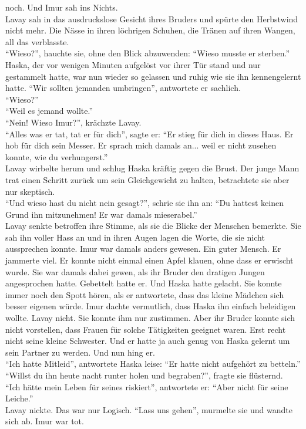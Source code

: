 noch. Und Imur sah ins Nichts.\\
Lavay sah in das ausdruckslose Gesicht ihres Bruders und spürte den Herbstwind nicht mehr. Die 
Nässe in ihren löchrigen Schuhen, die Tränen auf ihren Wangen, all das verblasste. \\
``Wieso?'', hauchte sie, ohne den Blick abzuwenden: ``Wieso musste er sterben.''\\
Haska, der vor wenigen Minuten aufgelöst vor ihrer Tür stand und nur gestammelt hatte, war nun 
wieder so gelassen und ruhig wie sie ihn kennengelernt hatte. ``Wir sollten jemanden umbringen'', 
antwortete er sachlich.\\
``Wieso?''\\
``Weil es jemand wollte.''\\
``Nein! Wieso Imur?'', krächzte Lavay.\\
``Alles was er tat, tat er für dich'', sagte er: ``Er stieg für dich in dieses Haus. Er hob für 
dich sein Messer. Er sprach mich damals an... weil er nicht zusehen konnte, wie du verhungerst.''\\
Lavay wirbelte herum und schlug Haska kräftig gegen die Brust. Der junge Mann trat einen Schritt 
zurück um sein Gleichgewicht zu halten, betrachtete sie aber nur skeptisch. \\
``Und wieso hast du nicht nein gesagt?'', schrie sie ihn an: ``Du hattest keinen Grund ihn 
mitzunehmen! Er war damals mieserabel.''\\
Lavay senkte betroffen ihre Stimme, als sie die Blicke der Menschen bemerkte. Sie sah ihn voller 
Hass an und in ihren Augen lagen die Worte, die sie nicht aussprechen konnte. Imur war damals 
anders gewesen. Ein guter Mensch. Er jammerte viel. Er konnte nicht einmal einen Apfel klauen, ohne 
dass er erwischt wurde. Sie war damals dabei gewen, als ihr Bruder den dratigen Jungen angesprochen 
hatte. Gebettelt hatte er. Und Haska hatte gelacht. Sie konnte immer noch den Spott hören, als er 
antwortete, dass das kleine Mädchen sich besser eigenen würde. Imur dachte vermutlich, dass Haska 
ihn einfach beleidigen wollte. Lavay nicht. Sie konnte ihm nur zustimmen. Aber ihr Bruder konnte 
sich nicht vorstellen, dass Frauen für solche Tätigkeiten geeignet waren. Erst recht nicht seine 
kleine Schwester. Und er hatte ja auch genug von Haska gelernt um sein Partner zu werden. Und nun 
hing er. \\
``Ich hatte Mitleid'', antwortete Haska leise: ``Er hatte nicht aufgehört zu betteln.''\\
``Willst du ihn heute nacht runter holen und begraben?'', fragte sie flüsternd.\\
``Ich hätte mein Leben für seines riskiert'', antwortete er: ``Aber nicht für seine Leiche.''\\
Lavay nickte. Das war nur Logisch. ``Lass uns gehen'', murmelte sie und wandte sich ab. Imur war 
tot. \\

